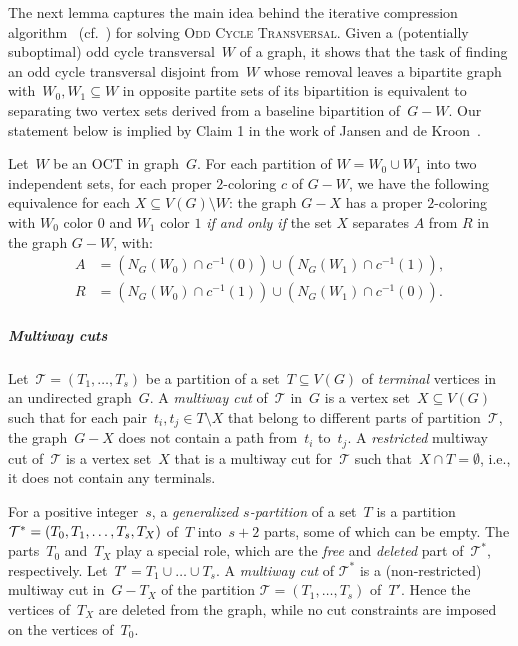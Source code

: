 The next lemma captures the main idea behind the iterative compression algorithm~\cite{ReedSV04} (cf.~\cite[\S 4.4]{CyganFKLMPPS15}) for solving \textsc{Odd Cycle Transversal}. Given a (potentially suboptimal) odd cycle transversal~$W$ of a graph, it shows that the task of finding an odd cycle transversal disjoint from~$W$ whose removal leaves a bipartite graph with~$W_0, W_1 \subseteq W$ in opposite partite sets of its bipartition is equivalent to separating two vertex sets derived from a baseline bipartition of~$G-W$. Our statement below is implied by Claim 1 in the work of Jansen and de Kroon~\cite{JansenK21}.
\begin{lemma} \label{lem:AR-separation}
	Let~$W$ be an OCT in graph~$G$. For each partition of $W = W_0 \cup W_1$ into two independent sets, for each proper $2$-coloring $c$ of $G - W$, we have the following equivalence for each $X \subseteq V(G) \setminus W$: the graph $G - X$ has a proper $2$-coloring with $W_0$ color $0$ and $W_1$ color $1$ \emph{if and only if} the set $X$ separates $A$ from $R$ in the graph $G - W$, with:
	\begin{align*}
		A &= (N_G(W_0) \cap c^{-1}(0)) \cup (N_G(W_1) \cap c^{-1}(1)), \\ 
		R &= (N_G(W_0) \cap c^{-1}(1)) \cup (N_G(W_1) \cap c^{-1}(0)).
	\end{align*}
\end{lemma}

\subparagraph*{Multiway cuts} Let~$\mathcal{T} = (T_1, \ldots, T_s)$ be a partition of a set~$T \subseteq V(G)$ of \emph{terminal} vertices in an undirected graph~$G$. A \emph{multiway cut} of~$\mathcal{T}$ in~$G$ is a vertex set~$X \subseteq V(G)$ such that for each pair~$t_i, t_j \in T \setminus X$ that belong to different parts of partition~$\mathcal{T}$, the graph~$G-X$ does not contain a path from~$t_i$ to~$t_j$. A \emph{restricted} multiway cut of~$\mathcal{T}$ is a vertex set~$X$ that is a multiway cut for~$\mathcal{T}$ such that~$X \cap T = \emptyset$, i.e., it does not contain any terminals. 

For a positive integer~$s$, a \emph{generalized $s$-partition} of a set~$T$ is a partition~$\mathcal{T}^* = (T_0, T_1, \ldots, T_s, \linebreak[1] T_X)$ of~$T$ into~$s+2$ parts, some of which can be empty. The parts~$T_0$ and~$T_X$ play a special role, which are the \emph{free} and \emph{deleted} part of~$\mathcal{T}^*$, respectively. Let~$T' = T_1 \cup \ldots \cup T_s$. A \emph{multiway cut} of $\mathcal{T}^*$ is a (non-restricted) multiway cut in~$G - T_X$ of the partition $\mathcal{T} = (T_1, \ldots, T_s)$ of~$T'$. Hence the vertices of~$T_X$ are deleted from the graph, while no cut constraints are imposed on the vertices of~$T_0$. 

